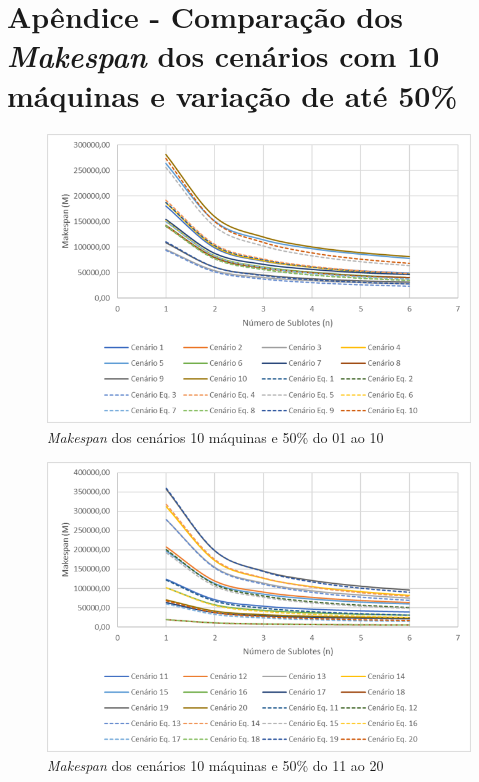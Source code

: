 \newpage
\section{Apêndice - Comparação dos \textit{Makespan} dos cenários com 10 máquinas e variação de até 50\%}\label{app:fig10machine50}

\begin{figure}[H]
    \centering
     \includegraphics[width=13cm]{Apendices/Figuras/10m50_01-10.png}
     \caption{\textit{Makespan} dos cenários 10 máquinas e 50\% do 01 ao 10}
    \label{fig:10m50_01-10}
\end{figure}

\begin{figure}[H]
    \centering
     \includegraphics[width=13cm]{Apendices/Figuras/10m50_11-20.png}
     \caption{\textit{Makespan} dos cenários 10 máquinas e 50\% do 11 ao 20}
    \label{fig:10m50_11-20}
\end{figure}

